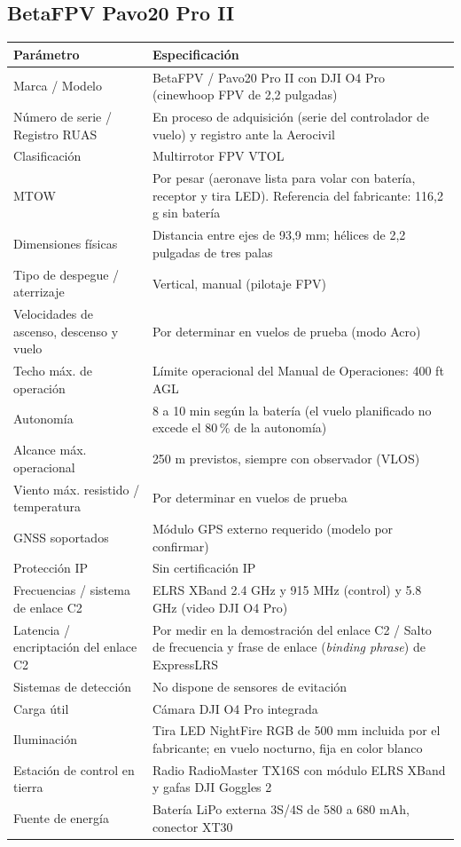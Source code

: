 \subsection*{BetaFPV Pavo20 Pro II}
\begin{longtable}{|p{5.2cm}|p{9.3cm}|}
\hline
\rowcolor{gray!30}\textbf{Parámetro} & \textbf{Especificación} \\ \hline
\endhead
Marca / Modelo & BetaFPV / Pavo20 Pro II con DJI O4 Pro (cinewhoop FPV de 2,2 pulgadas) \\ \hline
Número de serie / Registro RUAS & En proceso de adquisición (serie del controlador de vuelo) y registro ante la Aerocivil \\ \hline
Clasificación & Multirrotor FPV VTOL \\ \hline
MTOW & Por pesar (aeronave lista para volar con batería, receptor y tira LED). Referencia del fabricante: 116,2 g sin batería \\ \hline
Dimensiones físicas & Distancia entre ejes de 93,9 mm; hélices de 2,2 pulgadas de tres palas \\ \hline
Tipo de despegue / aterrizaje & Vertical, manual (pilotaje FPV) \\ \hline
Velocidades de ascenso, descenso y vuelo & Por determinar en vuelos de prueba (modo Acro) \\ \hline
Techo máx. de operación & Límite operacional del Manual de Operaciones: 400 ft AGL \\ \hline
Autonomía & 8 a 10 min según la batería (el vuelo planificado no excede el 80\,\% de la autonomía) \\ \hline
Alcance máx. operacional & 250 m previstos, siempre con observador (VLOS) \\ \hline
Viento máx. resistido / temperatura & Por determinar en vuelos de prueba \\ \hline
GNSS soportados & Módulo GPS externo requerido (modelo por confirmar) \\ \hline
Protección IP & Sin certificación IP \\ \hline
Frecuencias / sistema de enlace C2 & ELRS XBand 2.4 GHz y 915 MHz (control) y 5.8 GHz (video DJI O4 Pro) \\ \hline
Latencia / encriptación del enlace C2 & Por medir en la demostración del enlace C2 / Salto de frecuencia y frase de enlace (\textit{binding phrase}) de ExpressLRS \\ \hline
Sistemas de detección & No dispone de sensores de evitación \\ \hline
Carga útil & Cámara DJI O4 Pro integrada \\ \hline
Iluminación & Tira LED NightFire RGB de 500 mm incluida por el fabricante; en vuelo nocturno, fija en color blanco \\ \hline
Estación de control en tierra & Radio RadioMaster TX16S con módulo ELRS XBand y gafas DJI Goggles 2 \\ \hline
Fuente de energía & Batería LiPo externa 3S/4S de 580 a 680 mAh, conector XT30 \\ \hline
\end{longtable}

